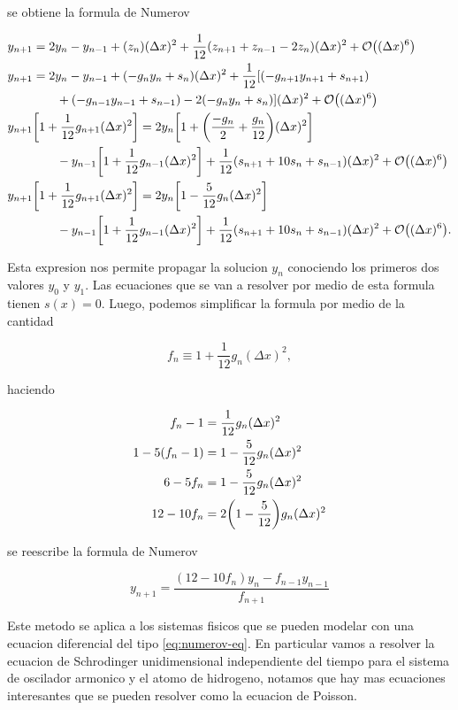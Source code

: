 \documentclass[11pt]{article}
\begin{document}
se obtiene la formula de Numerov

 \begin{align*}
  &y_{n+1} = 2y_n - y_{n-1} + (z_n)(\Delta x)^2 + \frac{1}{12}(z_{n+1}+z_{n-1}-2z_n)(\Delta x)^2 + \order{(\Delta x)^6} \\
  &y_{n+1} =  2y_n -y_{n-1} + (-g_ny_n + s_n) (\Delta x)^2 + \frac{1}{12} [(-g_{n+1}y_{n+1}+s_{n+1}) \\
  & \qq{}\qq{} +(-g_{n-1}y_{n-1}+s_{n-1})-2(-g_ny_n+s_n)](\Delta x)^2 + \order{(\Delta x)^6} \\
  &y_{n+1}\qty[1 + \frac{1}{12}g_{n+1}(\Delta x)^2] = 2y_n \qty[1+\qty(\frac{-g_n}{2}+\frac{g_n}{12})(\Delta x)^2] \\
  & \qq{}\qq{} - y_{n-1}\qty[1+\frac{1}{12}g_{n-1}(\Delta x)^2] + \frac{1}{12}(s_{n+1}+10s_n+s_{n-1})(\Delta x)^2 + \order{(\Delta x)^6} \\
  &y_{n+1}\qty[1 + \frac{1}{12}g_{n+1}(\Delta x)^2] = 2y_n \qty[1-\frac{5}{12}g_n(\Delta x)^2] \\
  & \qq{}\qq{} -y_{n-1}\qty[1+\frac{1}{12}g_{n-1}(\Delta x)^2] + \frac{1}{12}(s_{n+1}+10s_n+s_{n-1})(\Delta x)^2 + \order{(\Delta x)^6}.
\end{align*}

Esta expresion nos permite propagar la solucion \(y_n\) conociendo los primeros dos valores \(y_0\) y \(y_1\). Las ecuaciones que se van a resolver por medio de esta formula tienen \(s(x)=0\). Luego, podemos simplificar la formula por medio de la cantidad

\[ f_n \equiv 1 + \frac{1}{12}g_n(\Delta x)^2, \]

haciendo

\begin{align*}
    f_n - 1 &= \frac{1}{12}g_n(\Delta x)^2 \\
    1-5(f_n -1) &= 1-\frac{5}{12}g_n(\Delta x)^2 \\
    6-5f_n &= 1-\frac{5}{12}g_n(\Delta x)^2 \\
    12-10f_n &= 2\qty(1-\frac{5}{12})g_n(\Delta x)^2
\end{align*}

se reescribe la formula de Numerov

\begin{equation}
\label{eq:numerov}
    \boxed{y_{n+1} = \frac{(12-10f_n)y_n-f_{n-1}y_{n-1}}{f_{n+1}}}
\end{equation}




Este metodo se aplica a los sistemas fisicos que se pueden modelar con una ecuacion diferencial del tipo \ref{eq:numerov-eq}. En particular vamos a resolver la ecuacion de Schrodinger unidimensional independiente del tiempo para el sistema de oscilador armonico y el atomo de hidrogeno, notamos que hay mas ecuaciones interesantes que se pueden resolver como la ecuacion de Poisson.
\end{document}
